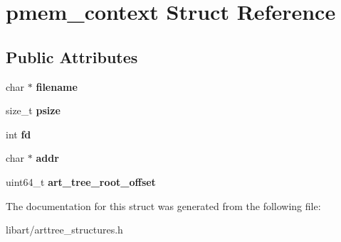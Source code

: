 \hypertarget{structpmem__context}{}\section{pmem\+\_\+context Struct Reference}
\label{structpmem__context}
\subsection*{Public Attributes}
\begin{DoxyCompactItemize}
\item 
\mbox{\label{structpmem__context_ae13986e87bb8758ef7b1a1c30b8cff90}} 
char $\ast$ {\bfseries filename}
\item 
\mbox{\label{structpmem__context_a21f61c59b9b0a8ca8eff5abe388d64d0}} 
size\+\_\+t {\bfseries psize}
\item 
\mbox{\label{structpmem__context_a861510648d0a6cec4286b16786f6bf6b}} 
int {\bfseries fd}
\item 
\mbox{\label{structpmem__context_a4defc605523e4e5781480fb976c0bb89}} 
char $\ast$ {\bfseries addr}
\item 
\mbox{\label{structpmem__context_a05d095228a1196fd196f86eb5f781417}} 
uint64\+\_\+t {\bfseries art\+\_\+tree\+\_\+root\+\_\+offset}
\end{DoxyCompactItemize}


The documentation for this struct was generated from the following file\+:\begin{DoxyCompactItemize}
\item 
libart/arttree\+\_\+structures.\+h\end{DoxyCompactItemize}

